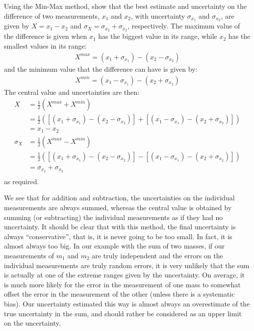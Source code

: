 \begin{example}{}{Using the Min-Max method, show that the best estimate and uncertainty on the difference of two measurements, $x_1$ and $x_2$, with uncertainty $\sigma_{x_1}$ and $\sigma_{x_2}$, are given by $X=x_1-x_2$ and $\sigma_{X} =\sigma_{x_2} + \sigma_{x_2}$, respectively.}{} 
The maximum value of the difference is given when $x_1$ has the biggest value in its range, while $x_2$ has the smallest values in its range:
\begin{align*}
X^{max}=(x_1+\sigma_{x_1})-(x_2-\sigma_{x_2})
\end{align*}
and the minimum value that the difference can have is given by:
\begin{align*}
X^{min}=(x_1-\sigma_{x_1})-(x_2+\sigma_{x_2})
\end{align*}
The central value and uncertainties are then:
\begin{align*}
X&=\frac{1}{2}(X^{max}+X^{min})\nonumber\\
 &=\frac{1}{2}\left(\left[(x_1+\sigma_{x_1})-(x_2-\sigma_{x_2})\right]+\left[(x_1-\sigma_{x_1})-(x_2+\sigma_{x_2})\right]\right)\nonumber\\
 &=x_1-x_2\nonumber\\
\sigma_{X} &=\frac{1}{2}(X^{max}-X^{min})\nonumber\\
 &=\frac{1}{2}\left(\left[(x_1+\sigma_{x_1})-(x_2-\sigma_{x_2})\right]-\left[(x_1-\sigma_{x_1})-(x_2+\sigma_{x_2})\right]\right)\nonumber\\
 &=\sigma_{x_1}+ \sigma_{x_2}\nonumber\\
\end{align*}
as required.
\end{example}
We see that for addition and subtraction, the uncertainties on the individual measurements are always summed, whereas the central value is obtained by summing (or subtracting) the individual measurements as if they had no uncertainty. It should be clear that with this method, the final uncertainty is always ``conservative'', that is, it is never going to be too small. In fact, it is almost always too big. In our example with the sum of two masses, if our measurements of $m_1$ and $m_2$ are truly independent and the errors on the individual measurements are truly random errors, it is very unlikely that the sum is actually at one of the extreme ranges given by the uncertainty. On average, it is much more likely for the error in the measurement of one mass to somewhat offset the error in the measurement of the other (unless there is a systematic bias). Our uncertainty estimated this way is almost always an overestimate of the true uncertainty in the sum, and should rather be considered as an upper limit on the uncertainty. 
